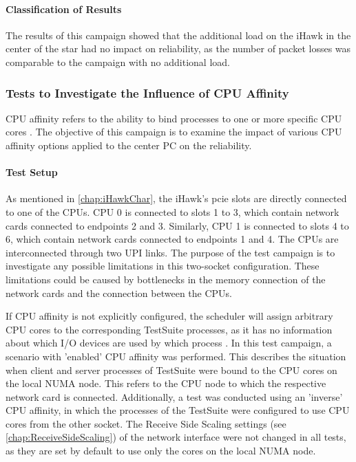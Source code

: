 \paragraph{Classification of Results}
The results of this campaign showed that the additional load on the iHawk in the center of the star had no impact on reliability, as the number of packet losses was comparable to the campaign with no additional load.


\subsubsection{Tests to Investigate the Influence of CPU Affinity} \label{chap:AffinityAnalysis}
CPU affinity refers to the ability to bind processes to one or more specific CPU cores \cite{reli06}. The objective of this campaign is to examine the impact of various CPU affinity options applied to the center PC on the reliability.

\paragraph{Test Setup}
As mentioned in \ref{chap:iHawkChar}, the iHawk's \ac{pcie} slots are directly connected to one of the CPUs. CPU 0 is connected to slots 1 to 3, which contain network cards connected to endpoints 2 and 3. Similarly, CPU 1 is connected to slots 4 to 6, which contain network cards connected to endpoints 1 and 4. The CPUs are interconnected through two UPI links. The purpose of the test campaign is to investigate any possible limitations in this two-socket configuration. These limitations could be caused by bottlenecks in the memory connection of the network cards and the connection between the CPUs.

If CPU affinity is not explicitly configured, the scheduler will assign arbitrary CPU cores to the corresponding TestSuite processes, as it has no information about which I/O devices are used by which process \cite{reli07}. In this test campaign, a scenario with 'enabled' CPU affinity was performed. This describes the situation when client and server processes of TestSuite were bound to the CPU cores on the local NUMA node. This refers to the CPU node to which the respective network card is connected. Additionally, a test was conducted using an 'inverse' CPU affinity, in which the processes of the TestSuite were configured to use CPU cores from the other socket. The Receive Side Scaling settings (see \ref{chap:ReceiveSideScaling}) of the network interface were not changed in all tests, as they are set by default to use only the cores on the local NUMA node.

